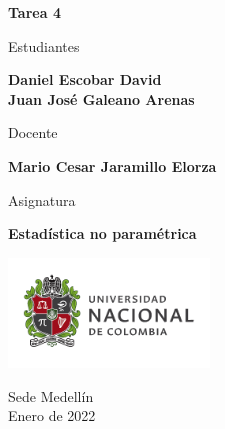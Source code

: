 \begin{titlepage}
   \Large{
   \begin{center}
       \vspace*{1cm}

       \textbf{Tarea 4}

            
       \vspace{1.5cm}
       
       Estudiantes
       
       \vspace{0.5cm}
        
        
       \textbf{Daniel Escobar David} \\

	\textbf{Juan José Galeano Arenas}

              \vspace{1cm}
       
       Docente
       
       \vspace{0.5cm}

       \textbf{Mario Cesar Jaramillo Elorza}
       
       \vspace{0.4cm}

       \vspace{1.4cm}
       
       Asignatura
       
       \vspace{0.5cm}

       \textbf{Estadística no paramétrica}

       \vfill

            
       \vspace{0.4cm}
     
       \includegraphics[width=0.4\textwidth]{logounal.png}
            
       Sede Medellín\\
       Enero de 2022
       
   \end{center}
   }
\end{titlepage}